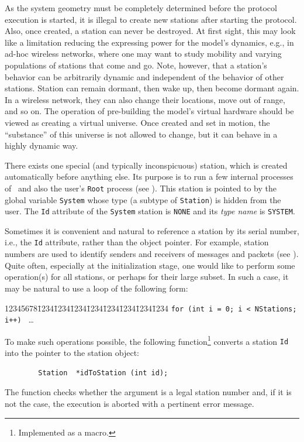 As the system geometry must be completely determined before the protocol
execution is started, it is illegal to create new stations after starting
the protocol.
Also, once created, a station can never be destroyed.
At first sight, this may look like a limitation reducing the expressing power
for the model's dynamics, e.g., in ad-hoc wireless networks, where one may
want to study mobility and varying populations of stations that come and go.
Note, however, that a station's behavior can be arbitrarily dynamic and
independent of the behavior of other stations.
Station can remain dormant, then wake up, then become dormant again.
In a wireless network, they can also change their locations, move out of range,
and so on.
The operation of pre-building the model's virtual hardware should be viewed as
creating a virtual universe.
Once created and set in motion, the ``substance'' of this universe is not
allowed to change, but it can behave in a highly dynamic way.

There exists one special (and typically inconspicuous) station,
which is created automatically before anything else.
Its purpose is to run a few internal processes
of \smurph\ and also the user's {\tt Root} process (see ).
This station is pointed to by the global variable {\tt System} whose
type (a subtype of {\tt Station}) is hidden from the user.
The {\tt Id} attribute of the {\tt System} station is {\tt NONE} and its
{\em type name\/} is {\tt SYSTEM}.

Sometimes it is convenient and natural to reference a station by its
serial number, i.e., the {\tt Id} attribute, rather than the object pointer.
For example, station numbers are used to identify senders and receivers
of messages and packets (see ).
Quite often, especially at the initialization stage, one would like to perform
some operation(s) for all stations, or perhaps for their large subset.
In such a case, it may be natural to use a loop of the following form:
{\tt\begin{tabbing}
12345678\=1234\=1234\=1234\=1234\=1234\=1234\=1234\=1234\kill
 \> {\tt for (int i = 0; i < NStations; i++) } \ldots
\end{tabbing}}
To make such operations possible,
the following function\footnote{Implemented as a macro.} converts a
station {\tt Id} into the pointer to the station object:
\begin{verbatim}
        Station  *idToStation (int id);
\end{verbatim}
The function checks whether the argument is a legal station number and, if it
is not the case, the execution is aborted with a pertinent error message.

